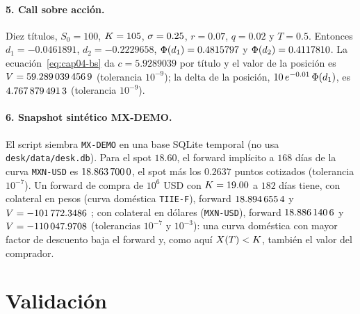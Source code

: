 \paragraph{5. Call sobre acción.} Diez títulos, $S_0=100$, $\K=105$, $\vol=0.25$, $r=0.07$, $q=0.02$ y
$T=0.5$. Entonces $d_1=-0.0461891$, $d_2=-0.2229658$, $\Ncdf(d_1)=0.4815797$ y $\Ncdf(d_2)=0.4117810$. La
ecuación~\eqref{eq:cap04-bs} da $c=5.9289039$ por título y el valor de la posición es
$\PV=\verif{cap04-bs-pv}{59.2890394569}$ (tolerancia $10^{-9}$); la delta de la posición,
$10\,e^{-0.01}\,\Ncdf(d_1)$, es $\verif{cap04-bs-delta}{4.7678794913}$ (tolerancia $10^{-9}$).

\paragraph{6. Snapshot sintético MX-DEMO.} El script siembra \texttt{MX-DEMO} en una base SQLite temporal
(no usa \texttt{desk/data/desk.db}). Para el spot $18.60$, el forward implícito a $168$ días de la curva
\texttt{MXN-USD} es $\verif{cap04-fwd-implicito}{18.8637000}$, el spot más los $0.2637$ puntos cotizados
(tolerancia $10^{-7}$). Un forward de compra de $10^6$ USD con $\K=19.00$ a $182$ días tiene, con colateral en
pesos (curva doméstica \texttt{TIIE-F}), forward $\verif{cap04-fwd-mxn}{18.8946554}$ y
$\PV=\verif{cap04-fwd-pv-mxn}{-101772.3486}$ \MXN{}; con colateral en dólares (\texttt{MXN-USD}), forward
$\verif{cap04-fwd-usd}{18.8861406}$ y $\PV=\verif{cap04-fwd-pv-usd}{-110047.9708}$ \MXN{} (tolerancias $10^{-7}$ y
$10^{-3}$): una curva doméstica con mayor factor de descuento baja el forward y, como aquí $\FxF{T}<\K$, también el
valor del comprador.

\section{Validación}\label{sec:cap04-validacion}

